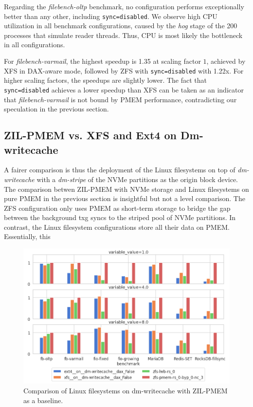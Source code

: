 \documentclass[12pt,a4paper,twoside]{book}
\begin{document}
Regarding the \textit{filebench-oltp} benchmark, no configuration performs exceptionally better than any other, including \lstinline{sync=disabled}.
We observe high CPU utilization in all benchmark configurations, caused by the \textit{hog} stage of the 200 processes that simulate reader threads.
Thus, CPU is most likely the bottleneck in all configurations.

For \textit{filebench-varmail}, the highest speedup is 1.35 at scaling factor $1$, achieved by XFS in DAX-aware mode, followed by ZFS with \lstinline{sync=disabled} with 1.22x.
For higher scaling factors, the speedups are slightly lower.
The fact that \lstinline{sync=disabled} achieves a lower speedup than XFS can be taken as an indicator that \textit{filebench-varmail} is not bound by PMEM performance, contradicting our speculation in the previous section.

\subsection{ZIL-PMEM vs. XFS and Ext4 on Dm-writecache}\label{sec:eval:dmwritecache}

A fairer comparison is thus the deployment of the Linux filesystems on top of \textit{dm-writecache} with a \textit{dm-stripe} of the NVMe partitions as the origin block device.
The comparison betwen ZIL-PMEM with NVMe storage and Linux filesystems on pure PMEM in the previous section is insightful but not a level comparison.
The ZFS configuration only uses PMEM as short-term storage to bridge the gap between the background txg syncs to the striped pool of NVMe partitions.
In contrast, the Linux filesystem configurations store all their data on PMEM.
Essentially, this 

\begin{figure}[H]
    \centering
    \includegraphics[width=\textwidth]{fig/evaluation/app_benchmarks__dm-writecache.png}
    \caption{
        Comparison of Linux filesystems on dm-writecache with ZIL-PMEM as a baseline.
    }
\end{figure}
\end{document}
